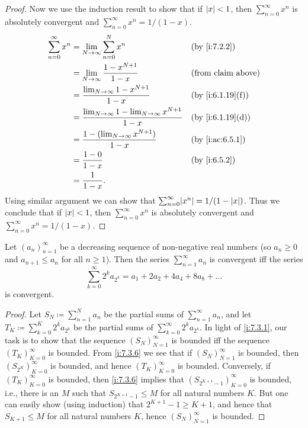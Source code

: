 \begin{proof}
  Now we use the induction result to show that if \(\left\lvert x\right\rvert < 1\), then \(\sum_{n = 0}^\infty x^n\) is absolutely convergent and \(\sum_{n = 0}^\infty x^n = 1 / (1 - x)\).
  \begin{align*}
    \sum_{n = 0}^\infty x^n & = \lim_{N \to \infty} \sum_{n = 0}^N x^n                               &  & \by{i:7.2.2}              \\
                            & = \lim_{N \to \infty} \dfrac{1 - x^{N + 1}}{1 - x}                     &  & \text{(from claim above)} \\
                            & = \dfrac{\lim_{N \to \infty} 1 - x^{N + 1}}{1 - x}                     &  & \by{i:6.1.19}[f]          \\
                            & = \dfrac{\lim_{N \to \infty} 1 - \lim_{N \to \infty} x^{N + 1}}{1 - x} &  & \by{i:6.1.19}[d]          \\
                            & = \dfrac{1 - (\lim_{N \to \infty} x^{N + 1})}{1 - x}                   &  & \by{i:ac:6.5.1}           \\
                            & = \dfrac{1 - 0}{1 - x}                                                 &  & \by{i:6.5.2}              \\
                            & = \dfrac{1}{1 - x}.
  \end{align*}
  Using similar argument we can show that \(\sum_{n = 0}^\infty \abs{x^n} = 1 / (1 - \abs{x})\).
  Thus we conclude that if \(\left\lvert x\right\rvert < 1\), then \(\sum_{n = 0}^\infty x^n\) is absolutely convergent and \(\sum_{n = 0}^\infty x^n = 1 / (1 - x)\).
\end{proof}

\begin{prop}\label{i:7.3.4}
  Let \((a_n)_{n = 1}^\infty\) be a decreasing sequence of non-negative real numbers
  (so \(a_n \geq 0\) and \(a_{n + 1} \leq a_n\) for all \(n \geq 1\)).
  Then the series \(\sum_{n = 1}^\infty a_n\) is convergent iff the series
  \[
    \sum_{k = 0}^\infty 2^k a_{2^k} = a_1 + 2a_2 + 4a_4 + 8a_8 + \dots
  \]
  is convergent.
\end{prop}

\begin{proof}
  Let \(S_N \coloneqq \sum_{n = 1}^N a_n\) be the partial sums of \(\sum_{n = 1}^\infty a_n\), and let \(T_K \coloneqq \sum_{k = 0}^K 2^k a_{2^k}\) be the partial sums of \(\sum_{k = 0}^\infty 2^k a_{2^k}\).
  In light of \cref{i:7.3.1}, our task is to show that the sequence \((S_N)_{N = 1}^\infty\) is bounded iff the sequence \((T_K)_{K = 0}^\infty\) is bounded.
  From \cref{i:7.3.6} we see that if \((S_N)_{N = 1}^\infty\) is bounded, then \((S_{2^K})_{K = 0}^\infty\) is bounded, and hence \((T_K)_{K = 0}^\infty\) is bounded.
  Conversely, if \((T_K)_{K = 0}^\infty\) is bounded, then \cref{i:7.3.6} implies that \((S_{2^{K + 1} - 1})_{K = 0}^\infty\) is bounded, i.e., there is an \(M\) such that \(S_{2^{K + 1} - 1} \leq M\) for all natural numbers \(K\).
  But one can easily show (using induction) that \(2^{K + 1} - 1 \geq K + 1\), and hence that \(S_{K + 1} \leq M\) for all natural numbers \(K\), hence \((S_N)_{N = 1}^\infty\) is bounded.
\end{proof}

